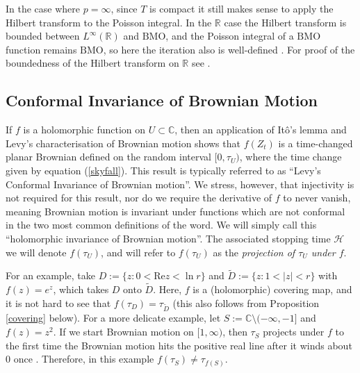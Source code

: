 \documentclass[a4paper, oneside, 12pt]{amsart}
\renewcommand{\Re}{\text{Re}}
\newcommand{\mc}{\mathcal}
\newcommand{\C}{\mathbb{C}}
\newcommand{\R}{\mathbb{R}}
\begin{document}
    In the case where $p=\infty$, since $T$ is compact it still makes sense to
    apply the Hilbert transform to the Poisson integral. In the $\R$ case the
    Hilbert transform is bounded between $L^\infty(\R)$ and $\mathrm{BMO}$, and
    the Poisson integral of a $\mathrm{BMO}$ function remains $\mathrm{BMO}$,
    so here the iteration also is well-defined \cite{stein}. For proof of the boundedness of the Hilbert transform on $\R$ see
    \cite{GFT}. 
    
\subsection{Conformal Invariance of Brownian Motion}

If $f$ is a holomorphic function on $U\subset \C$, then an application of It\^o's lemma 
and Levy's characterisation of Brownian motion shows that $f(Z_t)$ is a time-changed planar Brownian defined on the
random interval $[0, \tau_U)$, where the time change given by equation (\ref{skyfall}). 
This result is typically referred to as ``Levy's Conformal Invariance of Brownian motion''. 
We stress, however, that injectivity is not required for this result, nor do we require the derivative of $f$ to never vanish,
meaning Brownian motion is invariant under functions which are not conformal in the two most common definitions of the word. 
We will simply call this 
``holomorphic invariance of Brownian motion''. The associated stopping time $\mc{H}$ we will denote 
$f(\tau_U)$, and will refer to $f(\tau_U)$ as the {\it projection of $\tau_U$ under $f$}.

For an example, take $D := \{z: 0 < \Re z < \ln r\}$ and $\tilde D := \{z : 1 < |z| < r\}$ with 
$f(z) = e^z$, which takes $D$ onto $\tilde D$. Here, $f$ is a (holomorphic) covering map, and it is not hard to see that 
$f(\tau_D) = \tau_{\tilde D}$ (this also follows from Proposition \ref{covering} below). 
For a more delicate example, let $S := \C\setminus(-\infty, -1]$ and $f(z) = z^2$. If we start Brownian motion 
on $[1, \infty)$, then $\tau_S$ projects under $f$ to the first time the Brownian motion hits the positive real line after it winds
about $0$ once . Therefore, in this example $f(\tau_S) \neq \tau_{f(S)}$. 
\end{document}

